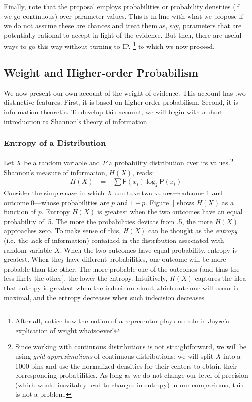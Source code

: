 \documentclass[
  10pt,
  dvipsnames,enabledeprecatedfontcommands]{scrartcl}
\begin{document}
Finally, note that the proposal employs probabilities or probability
densities (if we go continuous) over parameter values. This is in line
with what we propose if we do not assume these are chances and treat
them as, say, parameters that are potentially rational to accept in
light of the evidence. But then, there are useful ways to go this way
without turning to IP,
\footnote{After all, notice how the notion of a representor plays no role in Joyce's explication of weight whatsoever!}
to which we now proceed.

\hypertarget{weight-and-higher-order-probabilism}{%
\subsection{Weight and Higher-order
Probabilism}\label{weight-and-higher-order-probabilism}}

We now present our own account of the weight of evidence. This account
has two distinctive features. First, it is based on higher-order
probabilism. Second, it is information-theoretic. To develop this
account, we will begin with a short introduction to Shannon's theory of
information.

\hypertarget{entropy-of-a-distribution}{%
\subsubsection{Entropy of a
Distribution}\label{entropy-of-a-distribution}}

Let \(X\) be a random variable and \(P\) a probability distribution over
its values.\footnote{Since working with continuous distributions is not
  straightforward, we will be using \emph{grid approximations} of
  continuous distributions: we will split \(X\) into a 1000 bins and use
  the normalized densities for their centers to obtain their
  corresponding probabilities. As long as we do not change our level of
  precision (which would inevitably lead to changes in entropy) in our
  comparisons, this is not a problem.} Shannon's measure of information,
\(H(X)\), reads: \begin{align*}
H(X)  & =
- \sum \mathsf{P}(x_i) \log_2 \mathsf{P}(x_i)
\end{align*} \noindent  Consider the simple case in which \(X\) can take
two values---outcome 1 and outcome 0---whose probabilities are \(p\) and
\(1-p\). Figure \ref{}  shows \(H(X)\) as a
function of \(p\). Entropy \(H(X)\) is greatest when the two outcomes
have an equal probability of .5. The more the probabilities deviate from
.5, the more \(H(X)\) approaches zero. To make sense of this, \(H(X)\)
can be thought as the \textit{entropy} (i.e.~the lack of information)
contained in the distribution associated with random variable \(X\).
When the two outcomes have equal probability, entropy is greatest. When
they have different probabilities, one outcome will be more probable
than the other. The more probable one of the outcomes (and thus the less
likely the other), the lower the entropy. Intuitively, \(H(X)\) captures
the idea that entropy is greatest when the indecision about which
outcome will occur is maximal, and the entropy decreases when such
indecision decreases.
\end{document}

